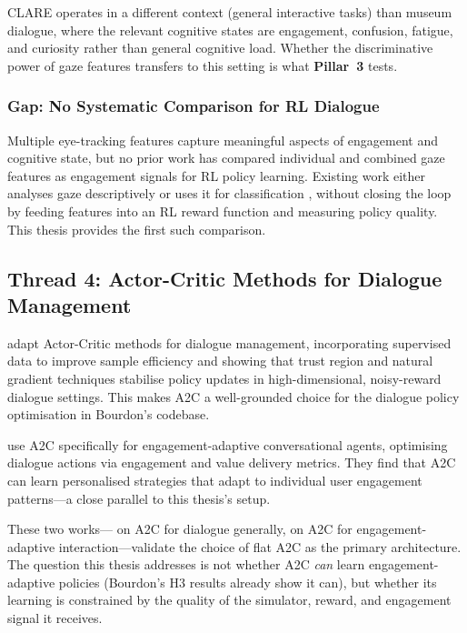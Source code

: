 \documentclass[a4paper, 11pt]{article}
\newcommand{\pillar}[1]{\textbf{Pillar~#1}}
\begin{document}
CLARE operates in a different context (general interactive tasks) than museum dialogue, where the relevant cognitive states are engagement, confusion, fatigue, and curiosity rather than general cognitive load. Whether the discriminative power of gaze features transfers to this setting is what \pillar{3} tests.

\subsubsection{Gap: No Systematic Comparison for RL Dialogue}

Multiple eye-tracking features capture meaningful aspects of engagement and cognitive state, but no prior work has compared individual and combined gaze features as engagement signals for RL policy learning. Existing work either analyses gaze descriptively \citep{milekic2025museum} or uses it for classification \citep{clare2024}, without closing the loop by feeding features into an RL reward function and measuring policy quality. This thesis provides the first such comparison.

\subsection{Thread 4: Actor-Critic Methods for Dialogue Management}
\label{sec:lit_actor_critic}

\citet{chen2017sample} adapt Actor-Critic methods for dialogue management, incorporating supervised data to improve sample efficiency and showing that trust region and natural gradient techniques stabilise policy updates in high-dimensional, noisy-reward dialogue settings. This makes A2C a well-grounded choice for the dialogue policy optimisation in Bourdon's codebase.

\citet{kumar2025continuous} use A2C specifically for engagement-adaptive conversational agents, optimising dialogue actions via engagement and value delivery metrics. They find that A2C can learn personalised strategies that adapt to individual user engagement patterns---a close parallel to this thesis's setup.

These two works---\citet{chen2017sample} on A2C for dialogue generally, \citet{kumar2025continuous} on A2C for engagement-adaptive interaction---validate the choice of flat A2C as the primary architecture. The question this thesis addresses is not whether A2C \emph{can} learn engagement-adaptive policies (Bourdon's H3 results already show it can), but whether its learning is constrained by the quality of the simulator, reward, and engagement signal it receives.
\end{document}
